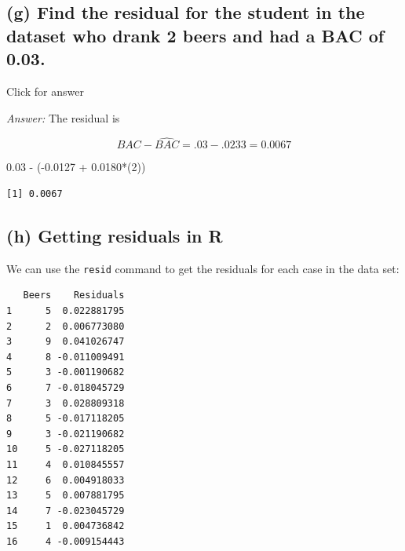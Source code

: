 \documentclass[
]{book}
\newenvironment{Shaded}{\begin{snugshade}}{\end{snugshade}}
\newcommand{\AttributeTok}[1]{\textcolor[rgb]{0.77,0.63,0.00}{#1}}
\newcommand{\CommentTok}[1]{\textcolor[rgb]{0.56,0.35,0.01}{\textit{#1}}}
\newcommand{\DecValTok}[1]{\textcolor[rgb]{0.00,0.00,0.81}{#1}}
\newcommand{\FloatTok}[1]{\textcolor[rgb]{0.00,0.00,0.81}{#1}}
\newcommand{\FunctionTok}[1]{\textcolor[rgb]{0.00,0.00,0.00}{#1}}
\newcommand{\NormalTok}[1]{#1}
\newcommand{\OtherTok}[1]{\textcolor[rgb]{0.56,0.35,0.01}{#1}}
\newcommand{\SpecialCharTok}[1]{\textcolor[rgb]{0.00,0.00,0.00}{#1}}
\begin{document}
\hypertarget{g-find-the-residual-for-the-student-in-the-dataset-who-drank-2-beers-and-had-a-bac-of-0.03.}{%
\subsection{(g) Find the residual for the student in the dataset who drank 2 beers and had a BAC of 0.03.}\label{g-find-the-residual-for-the-student-in-the-dataset-who-drank-2-beers-and-had-a-bac-of-0.03.}}

Click for answer

\emph{Answer:} The residual is

\[
BAC - \widehat{BAC} = .03 - .0233=0.0067
\]

\begin{Shaded}
\begin{Highlighting}[]
\FloatTok{0.03} \SpecialCharTok{{-}}\NormalTok{ (}\SpecialCharTok{{-}}\FloatTok{0.0127} \SpecialCharTok{+} \FloatTok{0.0180}\SpecialCharTok{*}\NormalTok{(}\DecValTok{2}\NormalTok{)) }
\end{Highlighting}
\end{Shaded}

\begin{verbatim}
[1] 0.0067
\end{verbatim}

\hypertarget{h-getting-residuals-in-r}{%
\subsection{(h) Getting residuals in R}\label{h-getting-residuals-in-r}}

We can use the \texttt{resid} command to get the residuals for each case in the data set:

\begin{Shaded}
\end{Shaded}

\begin{verbatim}
   Beers    Residuals
1      5  0.022881795
2      2  0.006773080
3      9  0.041026747
4      8 -0.011009491
5      3 -0.001190682
6      7 -0.018045729
7      3  0.028809318
8      5 -0.017118205
9      3 -0.021190682
10     5 -0.027118205
11     4  0.010845557
12     6  0.004918033
13     5  0.007881795
14     7 -0.023045729
15     1  0.004736842
16     4 -0.009154443
\end{verbatim}
\end{document}
